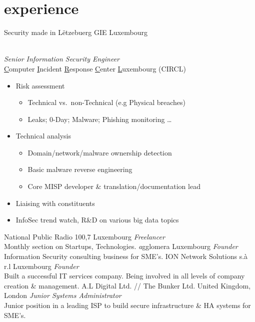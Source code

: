 \documentclass[a4paper]{friggeri-cv} %
\begin{document}
\section{experience}
\begin{entrylist}
{Security made in L\"{e}tzebuerg GIE}
{Luxembourg}
{\\
\emph{Senior Information Security Engineer} \\
\underline{C}omputer \underline{I}ncident \underline{R}esponse \underline{C}enter \underline{L}uxembourg (CIRCL)
\begin{itemize}
    \item Risk assessment
    \begin{itemize}
        \item Technical vs.\ non-Technical (e.g Physical breaches)
        \item Leaks; 0-Day; Malware; Phishing monitoring \ldots
    \end{itemize}
    \item Technical analysis
    \begin{itemize}
        \item Domain/network/malware ownership detection
        \item Basic malware reverse engineering
        \item Core MISP developer \& translation/documentation lead
    \end{itemize}
    \item Liaising with constituents
    \item InfoSec trend watch, R\&D on various big data topics
\end{itemize}
}
{National Public Radio 100,7}
{Luxembourg}
{\emph{Freelancer}\\
Monthly section on Startups, Technologies.}
{\emph{a}gglomera}
{Luxembourg}
{\emph{Founder}\\
Information Security consulting business for SME's.}
{ION Network Solutions s.\`{a} r.l}
{Luxembourg}
{\emph{Founder} \\
Built a successful IT services company. Being involved in all levels of company creation \& management.}
{A.L Digital Ltd. // The Bunker Ltd.}
{United Kingdom, London}
{\emph{Junior Systems Administrator} \\
Junior position in a leading ISP to build secure infrastructure \& HA systems for SME's.}
\end{entrylist}
\end{document}
